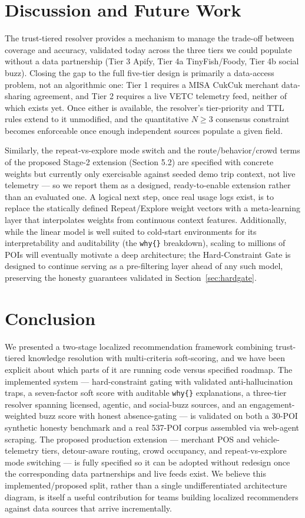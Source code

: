 \documentclass[acmsmall,screen]{acmart}
\begin{document}
\section{Discussion and Future Work}
The trust-tiered resolver provides a mechanism to manage the trade-off between coverage and accuracy, validated today across the three tiers we could populate without a data partnership (Tier 3 Apify, Tier 4a TinyFish/Foody, Tier 4b social buzz). Closing the gap to the full five-tier design is primarily a data-access problem, not an algorithmic one: Tier 1 requires a MISA CukCuk merchant data-sharing agreement, and Tier 2 requires a live VETC telemetry feed, neither of which exists yet. Once either is available, the resolver's tier-priority and TTL rules extend to it unmodified, and the quantitative $N \geq 3$ consensus constraint becomes enforceable once enough independent sources populate a given field.

Similarly, the repeat-vs-explore mode switch and the route/behavior/crowd terms of the proposed Stage-2 extension (Section 5.2) are specified with concrete weights but currently only exercisable against seeded demo trip context, not live telemetry — so we report them as a designed, ready-to-enable extension rather than an evaluated one. A logical next step, once real usage logs exist, is to replace the statically defined Repeat/Explore weight vectors with a meta-learning layer that interpolates weights from continuous context features. Additionally, while the linear model is well suited to cold-start environments for its interpretability and auditability (the \texttt{why\{\}} breakdown), scaling to millions of POIs will eventually motivate a deep architecture; the Hard-Constraint Gate is designed to continue serving as a pre-filtering layer ahead of any such model, preserving the honesty guarantees validated in Section~\ref{sec:hardgate}.

\section{Conclusion}
We presented a two-stage localized recommendation framework combining trust-tiered knowledge resolution with multi-criteria soft-scoring, and we have been explicit about which parts of it are running code versus specified roadmap. The implemented system — hard-constraint gating with validated anti-hallucination traps, a seven-factor soft score with auditable \texttt{why\{\}} explanations, a three-tier resolver spanning licensed, agentic, and social-buzz sources, and an engagement-weighted buzz score with honest absence-gating — is validated on both a 30-POI synthetic honesty benchmark and a real 537-POI corpus assembled via web-agent scraping. The proposed production extension — merchant POS and vehicle-telemetry tiers, detour-aware routing, crowd occupancy, and repeat-vs-explore mode switching — is fully specified so it can be adopted without redesign once the corresponding data partnerships and live feeds exist. We believe this implemented/proposed split, rather than a single undifferentiated architecture diagram, is itself a useful contribution for teams building localized recommenders against data sources that arrive incrementally.
\end{document}
